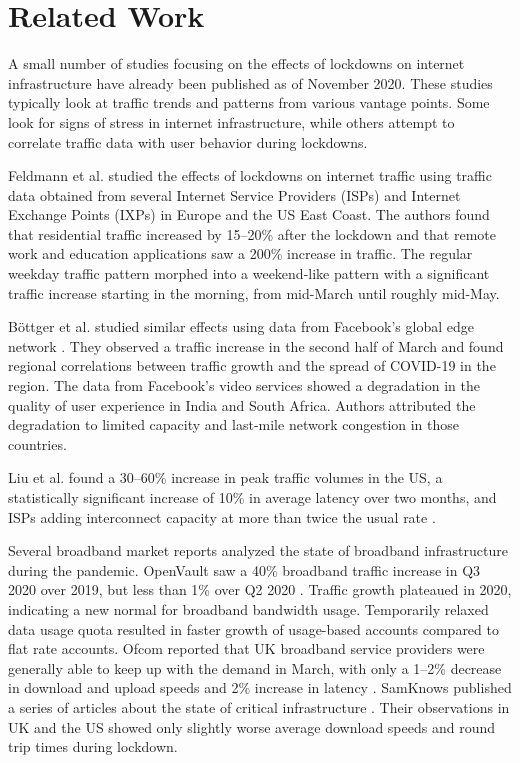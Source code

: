 \documentclass[conference,10pt]{IEEEtran}
\begin{document}
\section{Related Work}
\label{sec:related-work}



A small number of studies focusing on the effects of lockdowns on internet infrastructure have already been published as of November 2020. These studies typically look at traffic trends and patterns from various vantage points. Some look for signs of stress in internet infrastructure, while others attempt to correlate traffic data with user behavior during lockdowns.

Feldmann et al. studied the effects of lockdowns on internet traffic using traffic data obtained from several Internet Service Providers (ISPs) and Internet Exchange Points (IXPs) in Europe and the US East Coast\cite{feldmann2020lockdown}. The authors found that residential traffic increased by 15--20\% after the lockdown and that remote work and education applications saw a 200\% increase in traffic. The regular weekday traffic pattern morphed into a weekend-like pattern with a significant traffic increase starting in the morning, from mid-March until roughly mid-May.

B\"{o}ttger et al. studied similar effects using data from Facebook's global edge network \cite{bottger2020internet}. They observed a traffic increase in the second half of March and found regional correlations between traffic growth and the spread of COVID-19 in the region. The data from Facebook's video services showed a degradation in the quality of user experience in India and South Africa. Authors attributed the degradation to limited capacity and last-mile network congestion in those countries.

Liu et al. found a 30--60\% increase in peak traffic volumes in the US, a statistically significant increase of 10\% in average latency over two months, and ISPs adding interconnect capacity at more than twice the usual rate \cite{liu2020characterizing}.

Several broadband market reports analyzed the state of broadband infrastructure during the pandemic. OpenVault saw a 40\% broadband traffic increase in Q3 2020 over 2019, but less than 1\% over Q2 2020 \cite{openvault}. Traffic growth plateaued in 2020, indicating a new normal for broadband bandwidth usage. Temporarily relaxed data usage quota resulted in faster growth of usage-based accounts compared to flat rate accounts. Ofcom reported that UK broadband service providers were generally able to keep up with the demand in March, with only a 1--2\% decrease in download and upload speeds and 2\% increase in latency \cite{uk-home-broadband-performance}. SamKnows published a series of articles about the state of critical infrastructure \cite{samknows-cdn,samknows-video-streaming,samknows-video-conferencing,samknows-usa}. Their observations in UK and the US showed only slightly worse average download speeds and round trip times during lockdown.
\end{document}

